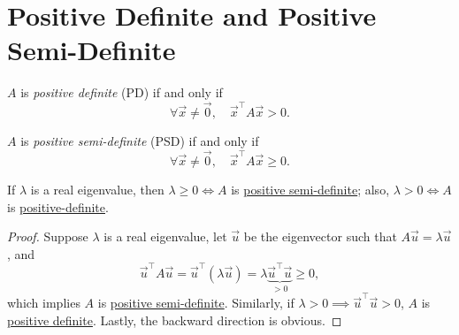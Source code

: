 \section{Positive Definite and Positive Semi-Definite}
\begin{definition}\label{def:positive-definite}
	\(A \) is \emph{positive definite} (PD) if and only if
	\[
		\forall \vec{x} \neq  \vec{0},\quad \vec{x}^{\top}A \vec{x} > 0.
	\]
\end{definition}

\begin{definition}\label{def:positive-semi-definite}
	\(A \) is \emph{positive semi-definite} (PSD) if and only if
	\[
		\forall \vec{x} \neq  \vec{0},\quad \vec{x}^{\top}A \vec{x} \geq  0.
	\]
\end{definition}

\begin{lemma}\label{lma:lec8-1}
	If \(\lambda\) is a real eigenvalue, then \(\lambda \geq  0 \iff A\) is \hyperref[def:positive-semi-definite]{positive semi-definite};
	also, \(\lambda > 0 \iff A\) is \hyperref[def:positive-definite]{positive-definite}.
\end{lemma}
\begin{proof}
	Suppose \(\lambda\) is a real eigenvalue, let \(\vec{u}\) be the eigenvector such that \(A \vec{u} = \lambda \vec{u}\), and
	\[
		\vec{u}^{\top} A \vec{u} = \vec{u}^{\top} (\lambda \vec{u}) = \lambda \underbrace{\vec{u}^{\top}\vec{u}}_{>0} \geq 0,
	\]
	which implies \(A\) is \hyperref[def:positive-semi-definite]{positive semi-definite}. Similarly, if \(\lambda > 0 \implies \vec{u}^{\top} \vec{u} > 0\),
	\(A\) is \hyperref[def:positive-definite]{positive definite}. Lastly, the backward direction is obvious.
\end{proof}

